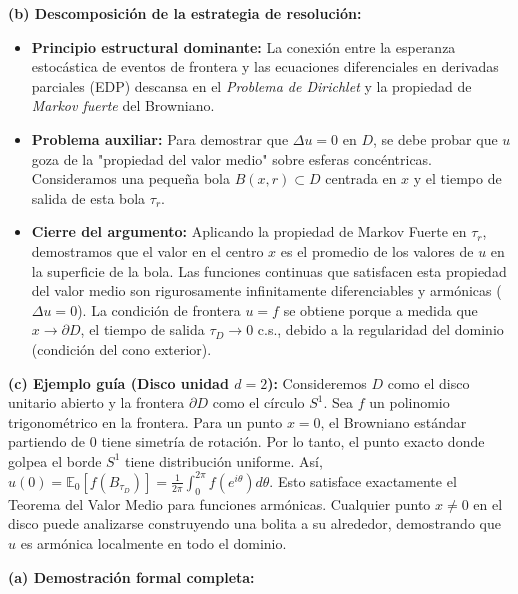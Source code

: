 \documentclass[11pt, letterpaper]{article}
\begin{document}
\begin{solucion}
    \textbf{(b) Descomposición de la estrategia de resolución:}
    \begin{itemize}
        \item[(i)] \textbf{Principio estructural dominante:} La conexión entre la esperanza estocástica de eventos de frontera y las ecuaciones diferenciales en derivadas parciales (EDP) descansa en el \textit{Problema de Dirichlet} y la propiedad de \textit{Markov fuerte} del Browniano.
        \item[(ii)] \textbf{Problema auxiliar:} Para demostrar que $\Delta u = 0$ en $D$, se debe probar que $u$ goza de la "propiedad del valor medio" sobre esferas concéntricas. Consideramos una pequeña bola $B(x, r) \subset D$ centrada en $x$ y el tiempo de salida de esta bola $\tau_r$. 
        \item[(iii)] \textbf{Cierre del argumento:} Aplicando la propiedad de Markov Fuerte en $\tau_r$, demostramos que el valor en el centro $x$ es el promedio de los valores de $u$ en la superficie de la bola. Las funciones continuas que satisfacen esta propiedad del valor medio son rigurosamente infinitamente diferenciables y armónicas ($\Delta u = 0$). La condición de frontera $u=f$ se obtiene porque a medida que $x \to \partial D$, el tiempo de salida $\tau_D \to 0$ c.s., debido a la regularidad del dominio (condición del cono exterior).
    \end{itemize}

    \vspace{3mm}
    \textbf{(c) Ejemplo guía (Disco unidad $d=2$):}
    Consideremos $D$ como el disco unitario abierto y la frontera $\partial D$ como el círculo $S^1$. Sea $f$ un polinomio trigonométrico en la frontera. 
    Para un punto $x=0$, el Browniano estándar partiendo de 0 tiene simetría de rotación. Por lo tanto, el punto exacto donde golpea el borde $S^1$ tiene distribución uniforme. Así, $u(0) = \mathbb{E}_0[f(B_{\tau_D})] = \frac{1}{2\pi} \int_0^{2\pi} f(e^{i\theta}) d\theta$. 
    Esto satisface exactamente el Teorema del Valor Medio para funciones armónicas. Cualquier punto $x \neq 0$ en el disco puede analizarse construyendo una bolita a su alrededor, demostrando que $u$ es armónica localmente en todo el dominio.

    \vspace{3mm}
    \textbf{(a) Demostración formal completa:}


\end{solucion}
\end{document}

